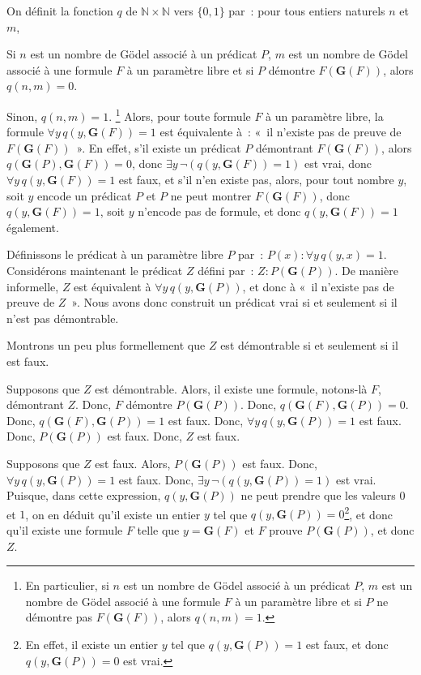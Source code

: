 On définit la fonction $q$ de $\mathbb{N} \times \mathbb{N}$ vers $\lbrace 0, 1 \rbrace$ par : pour tous entiers naturels $n$ et $m$, 
\startitemize[nowhite]
  \item Si $n$ est un nombre de Gödel associé à un prédicat $P$, $m$ est un nombre de Gödel associé à une formule $F$ à un paramètre libre et si $P$ démontre $F(\mathbf{G}(F))$, alors $q(n, m) = 0$.
  \item Sinon, $q(n, m) = 1$.%
    \footnote{En particulier, si $n$ est un nombre de Gödel associé à un prédicat $P$, $m$ est un nombre de Gödel associé à une formule $F$ à un paramètre libre et si $P$ ne démontre pas $F(\mathbf{G}(F))$, alors $q(n, m) = 1$.}
\stopitemize
Alors, pour toute formule $F$ à un paramètre libre, la formule $\forall y \, q(y, \mathbf{G}(F)) = 1$ est équivalente à : « il n'existe pas de preuve de $F(\mathbf{G}(F))$ ». 
En effet, s'il existe un prédicat $P$ démontrant $F(\mathbf{G}(F))$, alors $q(\mathbf{G}(P), \mathbf{G}(F)) = 0$, donc $\exists y \, \lnot (q(y, \mathbf{G}(F)) = 1)$ est vrai, donc $\forall y \, q(y, \mathbf{G}(F)) = 1$ est faux, et s'il n'en existe pas, alors, pour tout nombre $y$, soit $y$ encode un prédicat $P$ et $P$ ne peut montrer $F(\mathbf{G}(F))$, donc $q(y, \mathbf{G}(F)) = 1$, soit $y$ n'encode pas de formule, et donc $q(y, \mathbf{G}(F)) = 1$ également.

Définissons le prédicat à un paramètre libre $P$ par : $P(x): \forall y \, q(y, x) = 1$. 
Considérons maintenant le prédicat $Z$ défini par : $Z: P(\mathbf{G}(P))$. 
De manière informelle, $Z$ est équivalent à $\forall y \, q(y, \mathbf{G}(P))$, et donc à « il n'existe pas de preuve de $Z$ ». 
Nous avons donc construit un prédicat vrai si et seulement si il n'est pas démontrable. 

Montrons un peu plus formellement que $Z$ est démontrable si et seulement si il est faux.
\startitemize[nowhite]
  \item Supposons que $Z$ est démontrable. 
    Alors, il existe une formule, notons-là $F$, démontrant $Z$. 
    Donc, $F$ démontre $P(\mathbf{G}(P))$.
    Donc, $q(\mathbf{G}(F), \mathbf{G}(P)) = 0$. 
    Donc, $q(\mathbf{G}(F), \mathbf{G}(P)) = 1$ est faux. 
    Donc, $\forall y \, q(y,\mathbf{G}(P)) = 1$ est faux.
    Donc, $P(\mathbf{G}(P))$ est faux.
    Donc, $Z$ est faux.
  \item Supposons que $Z$ est faux.
    Alors, $P(\mathbf{G}(P))$ est faux.
    Donc, $\forall y \, q(y,\mathbf{G}(P)) = 1$ est faux.
    Donc, $\exists y \, \lnot (q(y,\mathbf{G}(P)) = 1)$ est vrai.
    Puisque, dans cette expression, $q(y,\mathbf{G}(P))$ ne peut prendre que les valeurs $0$ et $1$, on en déduit qu'il existe un entier $y$ tel que $q(y,\mathbf{G}(P)) = 0$\footnote{En effet, il existe un entier $y$ tel que $q(y,\mathbf{G}(P)) = 1$ est faux, et donc $q(y,\mathbf{G}(P)) = 0$ est vrai.}, et donc qu'il existe une formule $F$ telle que $y = \mathbf{G}(F)$ et $F$ prouve $P(\mathbf{G}(P))$, et donc $Z$. 
\stopitemize

